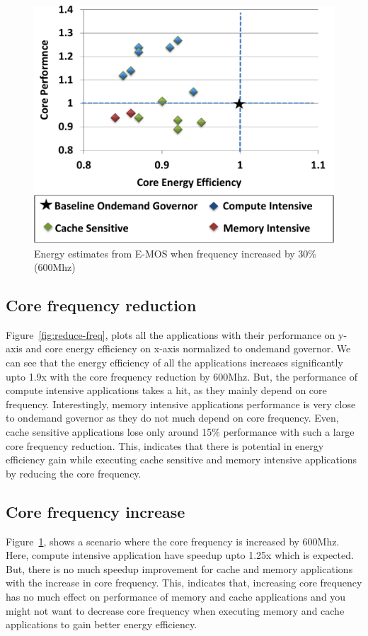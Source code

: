 \begin{figure}[h]
  \begin{center}
\includegraphics[width=\linewidth]{figs/ana-increase-crop.pdf}
  \end{center}
  \vspace{-0.1in}
  \caption{Energy estimates from E-MOS when frequency increased by 30\% (600Mhz)}
	\label{fig:increase-freq}
\end{figure}

\subsection{Core frequency reduction}
Figure~\ref{fig:reduce-freq}, plots all the applications
with their performance on y-axis and core energy efficiency on x-axis
normalized to ondemand governor. We can see that the energy efficiency
of all the applications increases significantly upto 1.9x with the core frequency reduction by 600Mhz.
But, the performance of compute intensive applications takes a hit, as they mainly depend on   
core frequency. Interestingly, memory intensive applications performance is very close to ondemand
governor as they do not much depend on core frequency. Even, cache sensitive applications
lose only around 15\% performance with such a large core frequency reduction. This, indicates that
there is potential in energy efficiency gain while executing  cache sensitive and memory intensive applications 
by reducing the core frequency. 

\subsection{Core frequency increase}
Figure~\ref{fig:increase-freq}, shows a scenario
where the core frequency is increased by 600Mhz.
Here, compute intensive application have speedup upto 1.25x which
is expected. But, there is no much speedup improvement for cache and memory applications
with the increase in core frequency. This, indicates that, increasing core frequency
has no much effect on performance of memory and cache applications and you might not want to decrease
core frequency when executing memory and cache applications to gain better energy efficiency.

